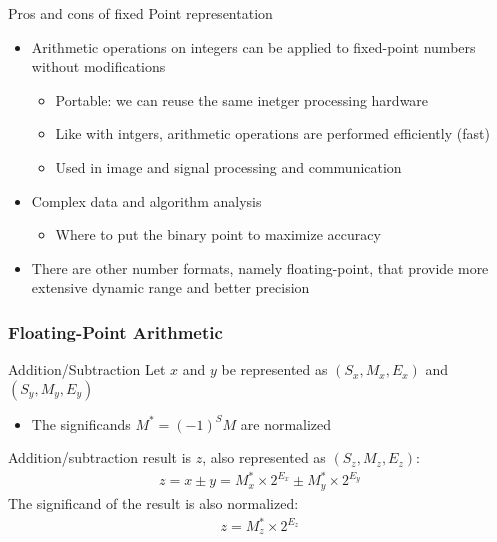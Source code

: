 \begin{parag}{Pros and cons of fixed Point representation}
\begin{itemize}
    \item Arithmetic operations on integers can be applied to fixed-point numbers without modifications
        \begin{itemize}
          \item  Portable: we can reuse the same inetger processing hardware
          \item Like with intgers, arithmetic operations are performed efficiently (fast)
             \item Used in image and signal processing and communication
        \end{itemize}
   
\end{itemize}
\begin{itemize}
    \item Complex data and algorithm analysis
        \begin{itemize}
            \item Where to put the binary point to maximize accuracy
        \end{itemize}
    \item There are other number formats, namely floating-point, that provide more extensive dynamic range and better precision
\end{itemize}
\end{parag}


\subsubsection{Floating-Point Arithmetic}
\begin{parag}{Addition/Subtraction}
    Let $x$ and $y$ be represented as $(S_x, M_x, E_x)$ and $(S_y, M_y, E_y)$
    \begin{itemize}
        \item The significands $M^* = (-1)^SM$ are normalized
    \end{itemize}
    Addition/subtraction result is $z$, also represented as $(S_z, M_z, E_z)$:
    \begin{align*}
        z = x \pm y = M_x^* \times 2^{E_x} \pm M_y^* \times 2^{E_y}
    \end{align*}
    The significand of the result is also normalized:
    \begin{align*}
        z = M_z^* \times 2^{E_z}
    \end{align*}
\end{parag}

